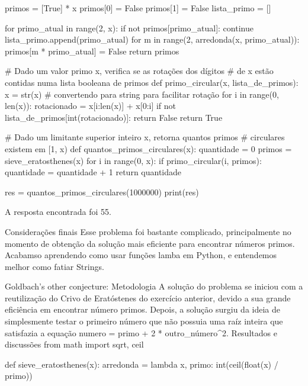                 primos = [True] * x
                primos[0] = False
                primos[1] = False
                lista_primo = []

                for primo_atual in range(2, x):
                    if not primos[primo_atual]:
                        continue
                    lista_primo.append(primo_atual)
                    for m in range(2, arredonda(x, primo_atual)):
                        primos[m * primo_atual] = False
                return primos

            # Dado um valor primo x, verifica se as rotações dos dígitos 
            # de x estão contidas numa lista booleana de primos
            def primo_circular(x, lista_de_primos):
                x = str(x) # convertendo para string para facilitar rotação
                for i in range(0, len(x)):
                    rotacionado = x[i:len(x)] + x[0:i]
                    if not lista_de_primos[int(rotacionado)]:
                        return False
                return True

            # Dado um limitante superior inteiro x, retorna quantos primos
            # circulares existem em [1, x)
            def quantos_primos_circulares(x):
                quantidade = 0
                primos = sieve_eratosthenes(x)
                for i in range(0, x):
                    if primo_circular(i, primos):
                        quantidade = quantidade + 1
                return quantidade

            res = quantos_primos_circulares(1000000)
            print(res)

            A resposta encontrada foi 55.

        Considerações finais
            Esse problema foi bastante complicado, principalmente no momento de obtenção da solução mais eficiente para encontrar números primos. Acabamso aprendendo como usar funções lamba em Python, e entendemos melhor como fatiar Strings.
    
    Goldbach's other conjecture:
        Metodologia
            A solução do problema se iniciou com a reutilização do Crivo de Eratóstenes do exercício anterior, devido a sua grande eficiência em encontrar número primos. Depois, a solução surgiu da ideia de simplesmente testar o primeiro número que não possuia uma raíz inteira que satisfazia a equação numero = primo + 2 * outro_número^2.
        Resultados e discussões
            from math import sqrt, ceil

            def sieve_eratosthenes(x):
                arredonda = lambda x, primo: int(ceil(float(x) / primo))

